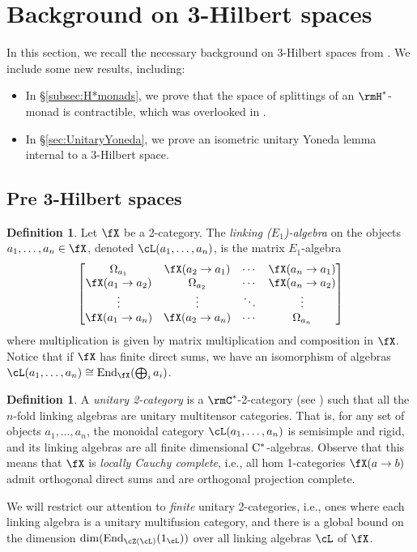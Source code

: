 \documentclass[12pt, reqno]{amsart}
\DeclareMathOperator{\End}{End}
\theoremstyle{plain}
\theoremstyle{definition}
\newtheorem{defn}[thm]{Definition}
\begin{document}
\section{Background on 3-Hilbert spaces}
\label{sec:backgrounon3Hilbs}

In this section, we recall the necessary background on 3-Hilbert spaces from \cite{MR5078555}.
We include some new results, including:
\begin{itemize}
\item
In \S\ref{subsec:H*monads}, we prove that the space of splittings of an $\rmH^*$-monad is contractible, which was overlooked in \cite{MR5078555}.
\item
In \S\ref{sec:UnitaryYoneda}, we prove an isometric unitary Yoneda lemma internal to a 3-Hilbert space.
\end{itemize}


\subsection{Pre 3-Hilbert spaces}


\begin{defn}
Let $\fX$ be a 2-category.
The \emph{linking ($E_1$)-algebra} on the objects $a_1,\dots,a_n \in \fX$, denoted $\cL(a_1,\dots,a_n)$, is the matrix $E_1$-algebra
\[ 
\begin{bmatrix}
\Omega_{a_1} & \fX(a_2\to a_1) & \cdots & \fX(a_n\to a_1) \\
\fX(a_1\to a_2) & \Omega_{a_2} & \cdots & \fX(a_n\to a_2) \\
\vdots & \vdots & \ddots & \vdots \\
\fX(a_1\to a_n) & \fX(a_2\to a_n) & \cdots & \Omega_{a_n}
\end{bmatrix}
\]
where multiplication is given by matrix multiplication and composition in $\fX$.
Notice that if $\fX$ has finite direct sums, we have an isomorphism of algebras $ \cL(a_1,\dots,a_n) \cong \End_\fX(\bigoplus_i a_i)$.
\end{defn}

\begin{defn}
A \emph{unitary 2-category} is a $\rmC^*$-2-category (see \cite{MR4419534}) such that all the $n$-fold linking algebras are unitary multitensor categories.
That is, for any set of objects $a_1,\dots,a_n$, the monoidal category $\cL(a_1,\dots,a_n)$ is semisimple and rigid, and its linking algebras are all finite dimensional $\rm C^*$-algebras.
Observe that this means that $\fX$ is \emph{locally Cauchy complete}, i.e., all hom 1-categories $\fX(a\to b)$ admit orthogonal direct sums and are orthogonal projection complete.

We will restrict our attention to \emph{finite} unitary 2-categories, i.e., ones where each linking algebra is a unitary multifusion category, and there is a global bound on the dimension 
$\dim(\End_{\cZ(\cL)}(1_\cL))$ 
over all linking algebras $\cL$ of $\fX$.
\end{defn}
\end{document}
